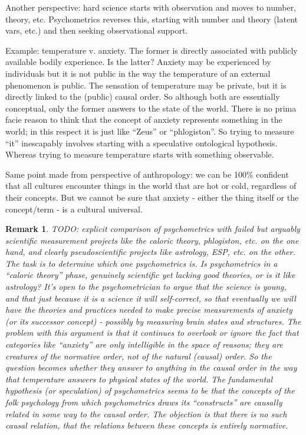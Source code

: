 \documentclass[11pt,twoside]{article}
\newtheorem{remark}{Remark}
\begin{document}
Another perspective: hard science starts with observation and moves to
number, theory, etc.  Psychometrics reverses this, starting with
number and theory (latent vars, etc.) and then seeking observational
support.

Example: temperature v. anxiety.  The former is directly associated
with publicly available bodily experience.  Is the latter?  Anxiety
may be experienced by individuals but it is not public in the way the
temperature of an external phenomenon is public.  The sensation of
temperature may be private, but it is directly linked to the (public)
causal order.  So although both are essentially conceptual, only the
former answers to the state of the world.  There is no prima facie
reason to think that the concept of anxiety represents something in
the world; in this respect it is just like ``Zeus'' or ``phlogiston''.
So trying to measure ``it'' inescapably involves starting with a
speculative ontological hypothesis.  Whereas trying to measure
temperature starts with something observable.

Same point made from perspective of anthropology: we can be 100\%
confident that all cultures encounter things in the world that are hot
or cold, regardless of their concepts.  But we cannot be sure that
anxiety - either the thing itself or the concept/term - is a cultural
universal.

\begin{remark}
  TODO: explicit comparison of psychometrics with failed but arguably
  scientific measurement projects like the caloric theory, phlogiston,
  etc. on the one hand, and clearly pseudoscientific projects like
  astrology, ESP, etc. on the other.  The task is to determine which
  one psychometrics is.  Is psychometrics in a ``caloric theory''
  phase, genuinely scientific yet lacking good theories, or is it like
  astrology?  It's open to the psychometrician to argue that the
  science is young, and that just because it is a science it will
  self-correct, so that eventually we will have the theories and
  practices needed to make precise measurements of anxiety (or its
  successor concept) - possibly by measuring brain states and
  structures.  The problem with this argument is that it continues to
  overlook or ignore the fact that categories like ``anxiety'' are
  only intelligible in the space of reasons; they are creatures of the
  normative order, not of the natural (causal) order.  So the question
  becomes whether they answer to anything in the causal order in the
  way that temperature answers to physical states of the world.  The
  fundamental hypothesis (or speculation) of psychometrics seems to be
  that the concepts of the folk psychology from which psychometrics
  draws its ``constructs'' are causally related in some way to the
  causal order.  The objection is that there is no such causal
  relation, that the relations between these concepts is entirely
  normative.
\end{remark}
\end{document}
